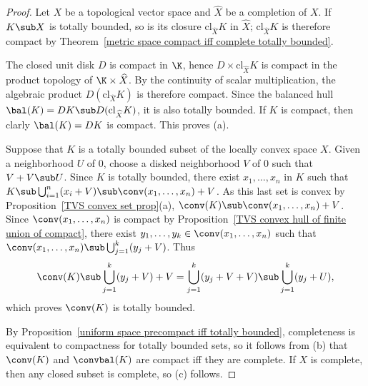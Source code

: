 \begin{proof}
Let $X$ be a topological vector space and $\widehat{X}$ be a completion of $X$. If $K\sub X$ is totally bounded, so is its closure $\mathrm{cl}_{\widehat{X}}K$ in $\widehat{X}$; $\mathrm{cl}_{\widehat{X}}K$ is therefore compact by Theorem~\ref{metric space compact iff complete totally bounded}.\par
The closed unit disk $D$ is compact in $\K$, hence $D\times \mathrm{cl}_{\widehat{X}}K$ is compact in the product topology of $\K\times\widehat{X}$. By the continuity of scalar multiplication, the algebraic product $D(\mathrm{cl}_{\widehat{X}}K)$ is therefore compact. Since the balanced hull $\bal(K)=DK\sub D(\mathrm{cl}_{\widehat{X}}K)$, it is also totally bounded. If $K$ is compact, then clarly $\bal(K)=DK$ is compact. This proves (a).\par
Suppose that $K$ is a totally bounded subset of the locally convex space $X$. Given a neighborhood $U$ of $0$, choose a disked neighborhood $V$ of $0$ such that $V+V\sub U$. Since $K$ is totally bounded, there exist $x_1,\dots,x_n$ in $K$ such that $K\sub\bigcup_{i=1}^{n}(x_i+V)\sub\conv(x_1,\dots,x_n)+V$. As this last set is convex by Proposition~\ref{TVS convex set prop}(a), $\conv(K)\sub\conv(x_1,\dots,x_n)+V$. Since $\conv(x_1,\dots,x_n)$ is compact by Proposition~\ref{TVS convex hull of finite union of compact}, there exist $y_1,\dots,y_k\in\conv(x_1,\dots,x_n)$ such that $\conv(x_1,\dots,x_n)\sub\bigcup_{j=1}^{k}(y_j+V)$. Thus 
\[\conv(K)\sub\bigcup_{j=1}^{k}(y_j+V)+V=\bigcup_{j=1}^{k}(y_j+V+V)\sub\bigcup_{j=1}^{k}(y_j+U),\]
which proves $\conv(K)$ is totally bounded.\par
By Proposition~\ref{uniform space precompact iff totally bounded}, completeness is equivalent to compactness for totally bounded sets, so it follows from (b) that $\conv(K)$ and $\convbal(K)$ are compact iff they are complete. If $X$ is complete, then any closed subset is complete, so (c) follows.
\end{proof}
